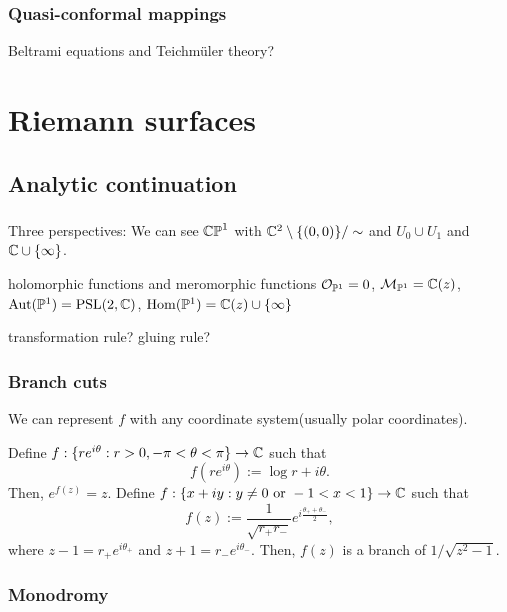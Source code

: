 \documentclass{../../large}
\begin{document}
\section{Quasi-conformal mappings}
Beltrami equations and Teichm\"uler theory?











\part{Riemann surfaces}

\chapter{Analytic continuation}
\section{}
Three perspectives:
We can see $\mathbb{CP}^1$ with $\mathbb{C}^2\setminus\{(0,0)\}/\sim$ and $U_0\cup U_1$ and $\mathbb{C}\cup\{\infty\}$.

holomorphic functions and meromorphic functions $\mathcal{O}_{\mathbb{P}^1}=0$, $\mathcal{M}_{\mathbb{P}^1}=\mathbb{C}(z)$, $\operatorname{Aut}(\mathbb{P}^1)=\mathrm{PSL}(2,\mathbb{C})$, $\operatorname{Hom}(\mathbb{P}^1)=\mathbb{C}(z)\cup\{\infty\}$

transformation rule? gluing rule?

\begin{prb}

\end{prb}



\section{Branch cuts}
We can represent $f$ with any coordinate system(usually polar coordinates).

Define $f:\{re^{i\theta}:r>0,-\pi<\theta<\pi\}\to\mathbb{C}$ such that
\[f(re^{i\theta}):=\log r+i\theta.\]
Then, $e^{f(z)}=z$.
Define $f:\{x+iy:y\ne0\text{ or }-1<x<1\}\to\mathbb{C}$ such that
\[f(z):=\frac1{\sqrt{r_+r_-}}e^{i\frac{\theta_++\theta_-}2},\]
where $z-1=r_+e^{i\theta_+}$ and $z+1=r_-e^{i\theta_-}$.
Then, $f(z)$ is a branch of $1/\sqrt{z^2-1}$.


\section{Monodromy}
\end{document}
